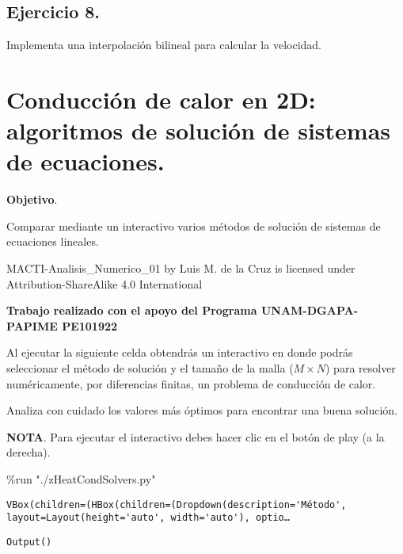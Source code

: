 \documentclass[
  letterpaper,
  DIV=11,
  numbers=noendperiod]{scrreprt}
\newenvironment{Shaded}{\begin{snugshade}}{\end{snugshade}}
\newcommand{\NormalTok}[1]{\textcolor[rgb]{0.00,0.23,0.31}{#1}}
\newcommand{\OperatorTok}[1]{\textcolor[rgb]{0.37,0.37,0.37}{#1}}
\newcommand{\StringTok}[1]{\textcolor[rgb]{0.13,0.47,0.30}{#1}}
\begin{document}
\section{Ejercicio 8.}\label{ejercicio-8.}

Implementa una interpolación bilineal para calcular la velocidad.


\chapter{Conducción de calor en 2D: algoritmos de solución de sistemas
de
ecuaciones.}\label{conducciuxf3n-de-calor-en-2d-algoritmos-de-soluciuxf3n-de-sistemas-de-ecuaciones.}

\textbf{Objetivo}.

Comparar mediante un interactivo varios métodos de solución de sistemas
de ecuaciones lineales.

MACTI-Analisis\_Numerico\_01 by Luis M. de la Cruz is licensed under
Attribution-ShareAlike 4.0 International

\textbf{Trabajo realizado con el apoyo del Programa UNAM-DGAPA-PAPIME
PE101922}

Al ejecutar la siguiente celda obtendrás un interactivo en donde podrás
seleccionar el método de solución y el tamaño de la malla
(\(M \times N\)) para resolver numéricamente, por diferencias finitas,
un problema de conducción de calor.

Analiza con cuidado los valores más óptimos para encontrar una buena
solución.

\textbf{NOTA}. Para ejecutar el interactivo debes hacer clic en el botón
de play (a la derecha).

\begin{Shaded}
\begin{Highlighting}[]
\OperatorTok{\%}\NormalTok{run }\StringTok{"./zHeatCondSolvers.py"}
\end{Highlighting}
\end{Shaded}

\begin{verbatim}
VBox(children=(HBox(children=(Dropdown(description='Método', layout=Layout(height='auto', width='auto'), optio…
\end{verbatim}

\begin{verbatim}
Output()
\end{verbatim}

\end{document}
